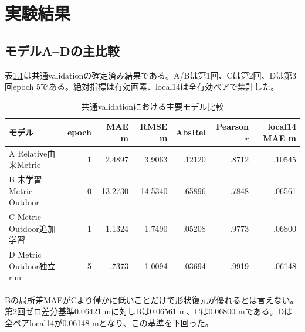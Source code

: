\chapter{実験結果}
\section{モデルA--Dの主比較}
表\ref{tab:maincompare}は共通validationの確定済み結果である。A/Bは第1回、Cは第2回、Dは第3回epoch 5である。絶対指標は有効画素、local14は全有効ペアで集計した。
\begin{table}[H]\centering\scriptsize
\caption{共通validationにおける主要モデル比較}\label{tab:maincompare}
\begin{tabular}{lrrrrrr}\toprule
モデル&epoch&MAE m&RMSE m&AbsRel&Pearson $r$&local14 MAE m\\\midrule
A Relative由来Metric&1&2.4897&3.9063&.12120&.8712&.10545\\
B 未学習Metric Outdoor&0&13.2730&14.5340&.65896&.7848&.06561\\
C Metric Outdoor追加学習&1&1.1324&1.7490&.05208&.9773&.06800\\
D Metric Outdoor独立run&5&.7373&1.0094&.03694&.9919&.06148\\\bottomrule
\end{tabular}\end{table}
Bの局所差MAEがCより僅かに低いことだけで形状復元が優れるとは言えない。第2回ゼロ差分基準0.06421 mに対しBは0.06561 m、Cは0.06800 mである。Dは全ペアlocal14が0.06148 mとなり、この基準を下回った。
